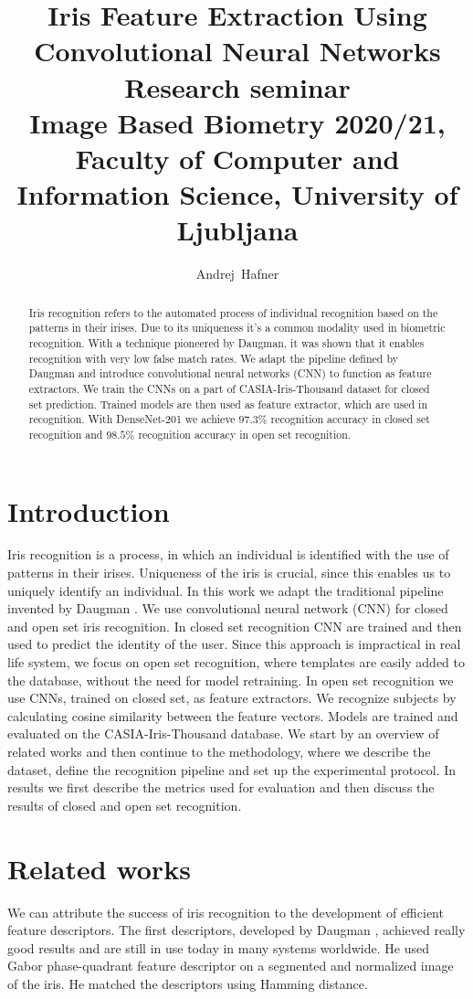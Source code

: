 \documentclass[9pt]{IEEEtran}
\title{\vspace{0ex} %
Iris Feature Extraction Using Convolutional Neural Networks
\\ \large{Research seminar}\\ \normalsize{Image Based Biometry 2020/21, Faculty of Computer and Information Science, University of Ljubljana}}
\author{ %
Andrej~Hafner
\vspace{-4.0ex}
}
\begin{document}
\maketitle

\begin{abstract}
Iris recognition refers to the automated process of individual recognition based on the patterns in their irises. Due to its uniqueness it's a common modality used in biometric recognition. With a technique pioneered by Daugman, it was shown that it enables recognition with very low false match rates. We adapt the pipeline defined by Daugman and introduce convolutional neural networks (CNN) to function as feature extractors. We train the CNNs on a part of CASIA-Iris-Thousand dataset for closed set prediction. Trained models are then used as feature extractor, which are used in recognition. With DenseNet-201 we achieve $97.3\%$ recognition accuracy in closed set recognition and $98.5\%$ recognition accuracy in open set recognition.
\end{abstract}

\section{Introduction}
Iris recognition is a process, in which an individual is identified with the use of patterns in their irises. Uniqueness of the iris is crucial, since this enables us to uniquely identify an individual. In this work we adapt the traditional pipeline invented by Daugman \cite{daugman2009iris}. We use convolutional neural network (CNN) for closed and open set iris recognition. In closed set recognition CNN are trained and then used to predict the identity of the user. Since this approach is impractical in real life system, we focus on open set recognition, where templates are easily added to the database, without the need for model retraining. In open set recognition we use CNNs, trained on closed set, as feature extractors. We recognize subjects by calculating cosine similarity between the feature vectors. Models are trained and evaluated on the CASIA-Iris-Thousand database. We start by an overview of related works and then continue to the methodology, where we describe the dataset, define the recognition pipeline and set up the experimental protocol. In results we first describe the metrics used for evaluation and then discuss the results of closed and open set recognition.

\section{Related works}
We can attribute the success of iris recognition to the development of efficient feature descriptors. The first descriptors, developed by Daugman \cite{daugman2009iris}, achieved  really good results and are still in use today in many systems worldwide. He used Gabor phase-quadrant feature descriptor on a segmented and normalized image of the iris. He matched the descriptors using Hamming distance.
\end{document}
